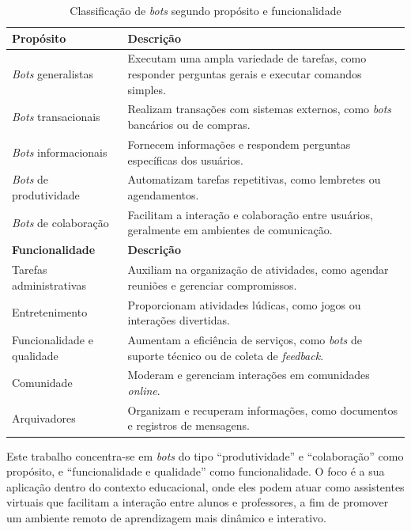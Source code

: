 \begin{table}[H]
\centering
\label{tab:classificacao_bots}
\begin{tabular}{|p{4.2cm}|p{9cm}|}
\hline
\textbf{Propósito}\cite{lebeuf2019}& \textbf{Descrição} \\
\hline
\textit{Bots} generalistas & Executam uma ampla variedade de tarefas, como
responder perguntas gerais e executar comandos simples. \\
\hline
\textit{Bots} transacionais & Realizam transações com sistemas externos, como
\textit{bots} bancários ou de compras. \\
\hline
\textit{Bots} informacionais & Fornecem informações e respondem perguntas
específicas dos usuários. \\
\hline
\textit{Bots} de produtividade & Automatizam tarefas repetitivas, como lembretes
ou agendamentos. \\
\hline
\textit{Bots} de colaboração & Facilitam a interação e colaboração entre
usuários, geralmente em ambientes de comunicação. \\
\hline
\hline
\textbf{Funcionalidade}\cite{seering2018} & \textbf{Descrição} \\
\hline
Tarefas administrativas & Auxiliam na organização de atividades, como agendar
reuniões e gerenciar compromissos. \\
\hline
Entretenimento & Proporcionam atividades lúdicas, como jogos ou interações
divertidas. \\
\hline
Funcionalidade e qualidade & Aumentam a eficiência de serviços, como
\textit{bots} de suporte técnico ou de coleta de \textit{feedback}. \\
\hline
Comunidade & Moderam e gerenciam interações em comunidades \textit{online}. \\
\hline
Arquivadores & Organizam e recuperam informações, como documentos e registros de
mensagens. \\
\hline
\end{tabular}
\caption{Classificação de \textit{bots} segundo propósito e funcionalidade}
\end{table}

\noindent Este trabalho concentra-se em \textit{bots} do tipo ``produtividade'' e
``colaboração'' como propósito, e ``funcionalidade e qualidade'' como
funcionalidade. O foco é a sua aplicação dentro do contexto educacional, onde
eles podem atuar como assistentes virtuais que facilitam a interação entre
alunos e professores, a fim de promover um ambiente remoto de aprendizagem mais
dinâmico e interativo.

